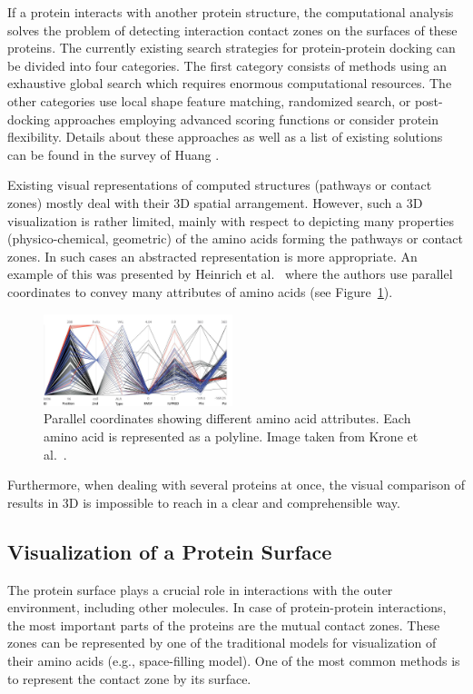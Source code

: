 \documentclass[11pt,a4paper,titlepage,oneside,onecolumn]{article}
\begin{document}
If a protein interacts with another protein structure, the computational analysis solves the problem of detecting interaction contact zones on the surfaces of these proteins. 
The currently existing search strategies for protein-protein docking can be divided into four categories. 
The first category consists of methods using an exhaustive global search which requires enormous computational resources.
The other categories use local shape feature matching, randomized search, or post-docking approaches employing advanced scoring functions or consider protein flexibility. Details about these approaches as well as a list of existing solutions can be found in the survey of Huang \cite{huang}.

Existing visual representations of computed structures (pathways or contact zones) mostly deal with their 3D spatial arrangement. 
However, such a 3D visualization is rather limited, mainly with respect to depicting many properties (physico-chemical, geometric) of the amino acids forming the pathways or contact zones. In such cases an abstracted representation is more appropriate. 
An example of this was presented by Heinrich et al.~\cite{Heinrich2014} where the authors use parallel coordinates to convey many attributes of amino acids (see Figure~\ref{fig:parallel}). 

\setlength\intextsep{0pt}
\begin{figure}
\vspace{-5mm}
  \begin{center}
  \includegraphics[width=0.49\textwidth]{pics/parallel2.png}
	\end{center}
\vspace{-5mm}
  \caption{Parallel coordinates showing different amino acid attributes. Each amino acid is represented as a polyline. Image taken from Krone et al.~\cite{Krone2014}.}
  \label{fig:parallel}
\end{figure}

Furthermore, when dealing with several proteins at once, the visual comparison of results in 3D is impossible to reach in a clear and comprehensible way.  

\subsection{Visualization of a Protein Surface}
The protein surface plays a crucial role in interactions with the outer environment, including other molecules. 
In case of protein-protein interactions, the most important parts of the proteins are the mutual contact zones. 
These zones can be represented by one of the traditional models for visualization of their amino acids (e.g., space-filling model). 
One of the most common methods is to represent the contact zone by its surface. 
\end{document}
